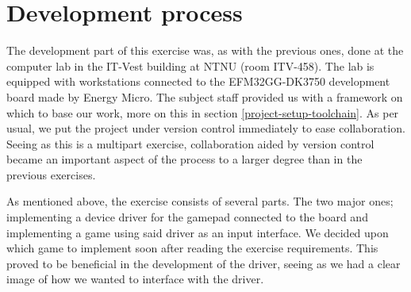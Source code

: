 \section{Development process}

The development part of this exercise was, as with the previous ones, done at the computer lab in the IT-Vest building at NTNU (room ITV-458). The lab is equipped with workstations connected to the EFM32GG-DK3750 development board made by Energy Micro.
The subject staff provided us with a framework on which to base our work, more on this in section \ref{project-setup-toolchain}.
As per usual, we put the project under version control immediately to ease collaboration. Seeing as this is a multipart exercise, collaboration aided by version control became an important aspect of the process to a larger degree than in the previous exercises.

As mentioned above, the exercise consists of several parts. The two major ones; implementing a device driver for the gamepad connected to the board and implementing a game using said driver as an input interface. We decided upon which game to implement soon after reading the exercise requirements. This proved to be beneficial in the development of the driver, seeing as we had a clear image of how we wanted to interface with the driver.

